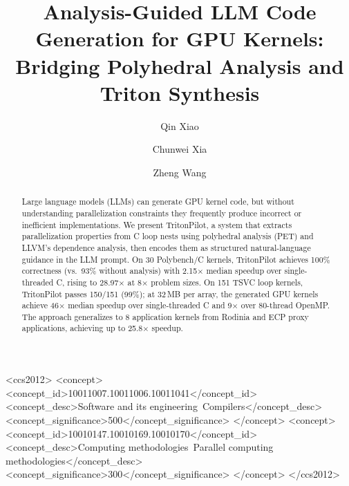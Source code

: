 \documentclass[sigconf]{acmart}
\newcommand{\sysname}{TritonPilot\xspace}
\newcommand{\pet}{PET\xspace}
\begin{document}
\title{Analysis-Guided LLM Code Generation for GPU Kernels:\\Bridging Polyhedral Analysis and Triton Synthesis}

\author{Qin Xiao}

\author{Chunwei Xia}

\author{Zheng Wang}

\begin{abstract}
Large language models (LLMs) can generate GPU kernel code, but without
understanding parallelization constraints they frequently produce
incorrect or inefficient implementations.  We present \sysname, a
system that extracts parallelization properties from C loop nests
using polyhedral analysis (\pet) and LLVM's dependence analysis, then
encodes them as structured natural-language guidance in the LLM prompt.
On 30 Polybench/C kernels, \sysname achieves 100\% correctness
(vs.\ 93\% without analysis) with 2.15$\times$ median speedup over
single-threaded C, rising to 28.97$\times$ at 8$\times$ problem sizes.
On 151 TSVC loop kernels, \sysname passes 150/151 (99\%);
at 32\,MB per array, the generated GPU kernels achieve 46$\times$
median speedup over single-threaded C and 9$\times$ over
80-thread OpenMP.
The approach generalizes to 8 application kernels from Rodinia and
ECP proxy applications, achieving up to 25.8$\times$ speedup.
\end{abstract}

\begin{CCSXML}
<ccs2012>
  <concept>
    <concept_id>10011007.10011006.10011041</concept_id>
    <concept_desc>Software and its engineering~Compilers</concept_desc>
    <concept_significance>500</concept_significance>
  </concept>
  <concept>
    <concept_id>10010147.10010169.10010170</concept_id>
    <concept_desc>Computing methodologies~Parallel computing methodologies</concept_desc>
    <concept_significance>300</concept_significance>
  </concept>
</ccs2012>
\end{CCSXML}


\end{document}
